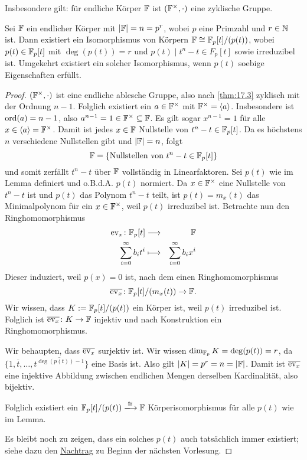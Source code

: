 \documentclass[12pt,a4paper]{scrartcl}
\begin{document}
\begin{bem} Insbesondere gilt: für endliche Körper $\mathbb F$ ist $(\mathbb F^{\times}, \cdot)$ eine zyklische Gruppe.
\end{bem}
\begin{lem}\label{lem:17.4}
	Sei $\mathbb F$ ein endlicher Körper mit $|\mathbb F| = n = p^r$, wobei $p$ eine Primzahl und $r\in\mathbb N$ ist. Dann existiert ein Isomorphismus von Körpern $\mathbb F\cong \mathbb F_p[t]/(p(t))$, wobei $p(t)\in \mathbb F_p[t]$ mit $\deg(p(t)) = r$ und $p(t)\mid t^n-t\in F_p[t]$ sowie irreduzibel ist. Umgekehrt existiert ein solcher Isomorphismus, wenn $p(t)$ soebige Eigenschaften erfüllt.
\end{lem}
\begin{proof}
	$(\mathbb F^{\times}, \cdot)$ ist eine endliche ablesche Gruppe, also nach \cref{thm:17.3} zyklisch mit der Ordnung $n-1$. Folglich existiert ein $a\in\mathbb F^{\times}$ mit $\mathbb F^{\times} = \langle a\rangle$. Insbesondere ist $\operatorname{ord}(a) = n-1$, also $a^{n-1} = 1\in\mathbb F^{\times}\subseteq \mathbb F$. Es gilt sogar $x^{n-1} = 1$ für alle $x\in\langle a\rangle = \mathbb F^{\times}$. Damit ist jedes $x\in \mathbb F$ Nullstelle von $t^n-t\in\mathbb F_p[t]$. Da es höchstens $n$ verschiedene Nullstellen gibt und $|\mathbb F| = n $, folgt 
	\[\mathbb F= \{\text{Nullstellen von $t^n-t\in\mathbb F_p[t]$}\}\]
	und somit zerfällt $t^n-t$ über $\mathbb F$ vollständig in Linearfaktoren. Sei $p(t)$ wie im Lemma definiert und o.B.d.A. $p(t)$ normiert. Da $x\in\mathbb F^{\times}$ eine Nullstelle von $t^{n}-t$ ist und $p(t)$ das Polynom $t^{n}-t$ teilt, ist $p(t) = m_x(t)$ das Minimalpolynom für ein $x\in\mathbb F^{\times}$, weil $p(t)$ irreduzibel ist. Betrachte nun den Ringhomomorphismus
	\begin{eqnarray*}
		\operatorname{ev}_x\colon \mathbb F_p[t] &\longrightarrow & \mathbb F\\
		\sum_{i = 0}^{\infty}b_it^i & \longmapsto & \sum_{i = 0}^{\infty}b_ix^i
	\end{eqnarray*}
	Dieser induziert, weil $p(x) = 0$ ist, nach dem  einen Ringhomomorphismus
	\[\overline{\operatorname{ev}_x}\colon \mathbb F_p[t]/(m_x(t)) \to \mathbb F.\]
	Wir wissen, dass $K :=\mathbb F_p[t]/(p(t))$ ein Körper ist, weil $p(t)$ irreduzibel ist. Folglich ist $\overline{\operatorname{ev}_x}\colon K\to \mathbb F$ injektiv und nach Konstruktion ein Ringhomomorphismus.
	
	Wir behaupten, dass $\overline{\operatorname{ev}_x}$ surjektiv ist. Wir wissen $\dim_{\mathbb F_p}K = \deg(p(t)) = r$, da $\{1,\overline{t},\dots, \overline{t^{\deg(p(t))-1}}\}$ eine Basis ist. Also gilt $|K| = p^r = n = |\mathbb F|$. Damit ist $\overline{\operatorname{ev}_x}$ eine injektive Abbildung zwischen endlichen Mengen derselben Kardinalität, also bijektiv.
	
	Folglich existiert ein $\IF_p[t]/(p(t))\xlongrightarrow{\cong}\IF$ Körperisomorphismus für alle $p(t)$ wie im Lemma.
	
	Es bleibt noch zu zeigen, dass ein solches $p(t)$ auch tatsächlich immer existiert; siehe dazu den \hyperref[nachtrag zu 17.4]{Nachtrag} zu Beginn der nächsten Vorlesung.
\end{proof}
\end{document}
